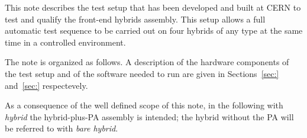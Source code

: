 This note describes the test setup that has been developed and built
at CERN to test and qualify the front-end hybrids assembly.
This setup allows a full automatic test sequence to be carried out on
four hybrids of any type at the same time in a controlled environment.

The note is organized as follows. A description of the hardware
components of the test setup and of the software needed to run are
given in Sections~\ref{sec:} and~\ref{sec:} respectevely.

As a consequence of the well defined scope of this note, in the
following with {\em hybrid} the hybrid-plus-PA assembly is intended;
the hybrid without the PA will be referred to with {\em bare hybrid}.
